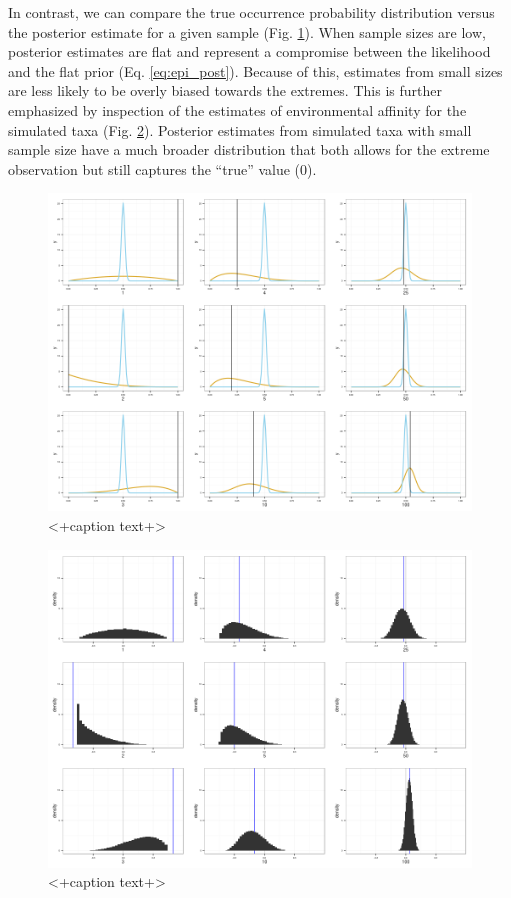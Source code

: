 \documentclass[12pt,letterpaper]{article}
\begin{document}
In contrast, we can compare the true occurrence probability distribution versus the posterior estimate for a given sample (Fig. \ref{fig:env_post}). When sample sizes are low, posterior estimates are flat and represent a compromise between the likelihood and the flat prior (Eq. \ref{eq:epi_post}). Because of this, estimates from small sizes are less likely to be overly biased towards the extremes. This is further emphasized by inspection of the estimates of environmental affinity for the simulated taxa (Fig. \ref{fig:env_diff}). Posterior estimates from simulated taxa with small sample size have a much broader distribution that both allows for the extreme observation but still captures the ``true'' value (0). 
\begin{figure}[ht]
  \centering
  \includegraphics[height = \textheight,width=\textwidth,keepaspectratio=true]{figure/env_post_inspect}
  \caption{<+caption text+>}
  \label{fig:env_post}
\end{figure}

\begin{figure}[ht]
  \centering
  \includegraphics[height = \textheight,width=\textwidth,keepaspectratio=true]{figure/env_diff}
  \caption{<+caption text+>}
  \label{fig:env_diff}
\end{figure}
\end{document}
